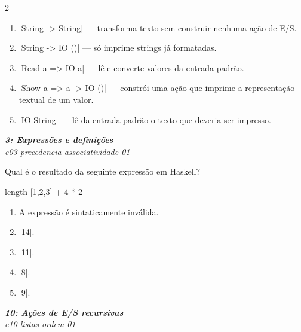 \documentclass[a4paper,10pt,brazil]{article}
\begin{document}
\begin{multicols}{2}
\begin{enumerate}
  \item \haskellinline|String -> String| — transforma texto sem construir nenhuma ação de E/S.

  \item \haskellinline|String -> IO ()| — só imprime strings já formatadas.

  \item \haskellinline|Read a => IO a| — lê e converte valores da entrada padrão.

  \item \haskellinline|Show a => a -> IO ()| — constrói uma ação que imprime a representação textual de um valor.

  \item \haskellinline|IO String| — lê da entrada padrão o texto que deveria ser impresso.


\end{enumerate}

\begin{flushright}
  \footnotesize
  \textit{\textbf{3: Expressões e definições}}\\
  \textit{c03-precedencia-associatividade-01}\\

\end{flushright}
Qual é o resultado da seguinte expressão em Haskell?

\begin{haskellcode}
length [1,2,3] + 4 * 2
\end{haskellcode}

\begin{enumerate}
  \item A expressão é sintaticamente inválida.

  \item \haskellinline|14|.

  \item \haskellinline|11|.

  \item \haskellinline|8|.

  \item \haskellinline|9|.


\end{enumerate}

\begin{flushright}
  \footnotesize
  \textit{\textbf{10: Ações de E/S recursivas}}\\
  \textit{c10-listas-ordem-01}\\


\end{flushright}
\end{multicols}
\end{document}
